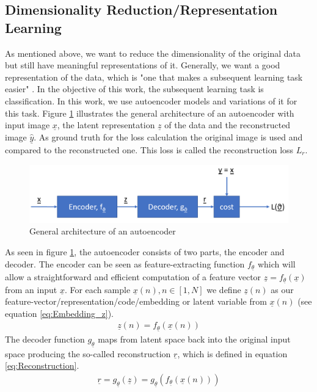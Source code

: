 \documentclass[12pt,DIV14,BCOR12mm,a4paper,footexclude,headinclude,halfparskip-,twoside,openright,cleardoubleempty,idxtotoc,bibtotoc,listtotoc]{scrreprt} %
\numberwithin{equation}{chapter}
\begin{document}
\subsection{Dimensionality Reduction/Representation Learning}
As mentioned above, we want to reduce the dimensionality of the original data but still have meaningful representations of it. Generally, we want a good representation of the data, which is "one that makes a subsequent learning task easier" \cite{Goodfellow-et-al-2016}. In the objective of this work, the subsequent learning task is classification. In this work, we use autoencoder models and variations of it for this task. Figure \ref{fig:Autoencoder} illustrates the general architecture of an autoencoder with input image $\underline{x}$, the latent representation $\underline{z}$ of the data and the reconstructed image $\underline{\hat{y}}$. As ground truth for the loss calculation the original image is used and compared to the reconstructed one. This loss is called the reconstruction loss $L_{r}$.
\begin{figure}[htb!]
	\centering
	\includegraphics[width=0.6\linewidth]{Graphiken/Autoencoder_Architecture}
	\caption{General architecture of an autoencoder}
	\label{fig:Autoencoder}
\end{figure}
As seen in figure \ref{fig:Autoencoder}, the autoencoder consists of two parts, the encoder and decoder. The encoder can be seen as feature-extracting function $f_{\underline{\theta}}$ which will allow a straightforward and efficient computation of a feature vector $\underline{z} = f_{\underline{\theta}}(\underline{x})$ from an input $\underline{x}$. For each sample $\underline{x}(n), n \in [1,N]$ we define $\underline{z}(n)$ as our feature-vector/representation/code/embedding or latent variable from $\underline{x}(n)$ (see equation \ref{eq:Embedding_z}). 
\begin{align}
	\underline{z}(n) = f_{\underline{\theta}}(\underline{x}(n))\label{eq:Embedding_z}
\end{align}
The decoder function $g_{\underline{\theta}}$ maps from latent space back into the original input space producing the so-called reconstruction $\underline{r}$, which is defined in equation \ref{eq:Reconstruction}.
\begin{align}
	\underline{r} = g_{\underline{\theta}}(\underline{z}) = g_{\underline{\theta}}(f_{\underline{\theta}}(\underline{x}(n)))\label{eq:Reconstruction}
\end{align}
\end{document}
